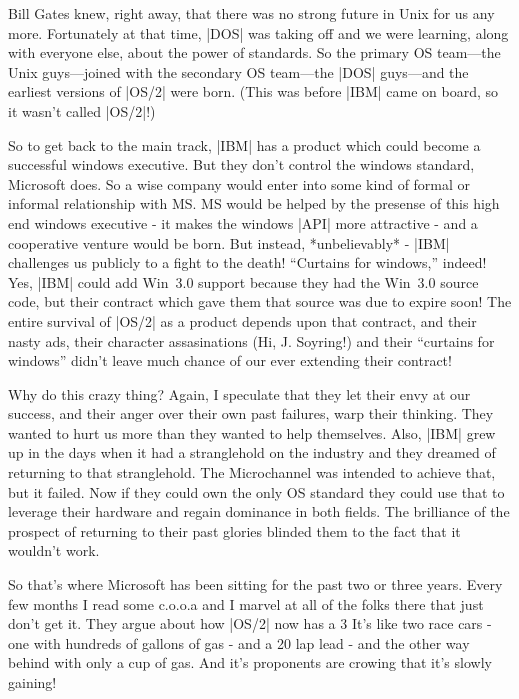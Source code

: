Bill Gates knew, right away, that there was no
strong future in Unix for us any more.  Fortunately at that time, |DOS|
was taking off and we were learning, along with everyone else, about
the power of standards.  So the primary OS team---the Unix guys---joined
with the secondary OS team---the |DOS| guys---and the earliest versions
of |OS/2| were born.  (This was before |IBM| came on board, so it wasn't called 
|OS/2|!)

So to get back to the main track, |IBM| has a product which could become
a successful windows executive.  But they don't control the windows standard, 
Microsoft does.  So a wise company would enter into some kind of formal
or informal relationship with MS.  MS would be helped by the presense of
this high end windows executive - it makes the windows |API| more attractive -
and a cooperative venture would be born.  But instead, *unbelievably* - 
|IBM| challenges us publicly to a fight to the death!  ``Curtains for windows,''
indeed!  Yes, |IBM| could add Win~3.0 support because they had the Win~3.0
source code, but their contract which gave them that source was due to
expire soon!  The entire survival of |OS/2| as a product depends upon that
contract, and their nasty ads, their character assasinations (Hi, J. Soyring!)
and their ``curtains for windows'' didn't leave much chance of our ever
extending their contract!

Why do this crazy thing?  Again, I speculate that they let their envy
at our success, and their anger over their own past failures, warp their
thinking.  They wanted to hurt us more than they wanted to help themselves.
Also, |IBM| grew up in the days when it had a stranglehold on the industry
and they dreamed of returning to that stranglehold.  The Microchannel
was intended to achieve that, but it failed.  Now if they could own the
only OS standard they could use that to leverage their hardware and
regain dominance in both fields.  The brilliance of the prospect of
returning to their past glories blinded them to the fact that it wouldn't
work.

So that's where Microsoft has been sitting for the past two or three
years.  Every few months I read some c.o.o.a and I marvel at all of
the folks there that just don't get it.  They argue about how |OS/2| now has
a 3%
It's like two race cars - one with hundreds of gallons of gas - and
a 20 lap lead - and the other way behind with only a cup of gas.  And
it's proponents are crowing that it's slowly gaining!


